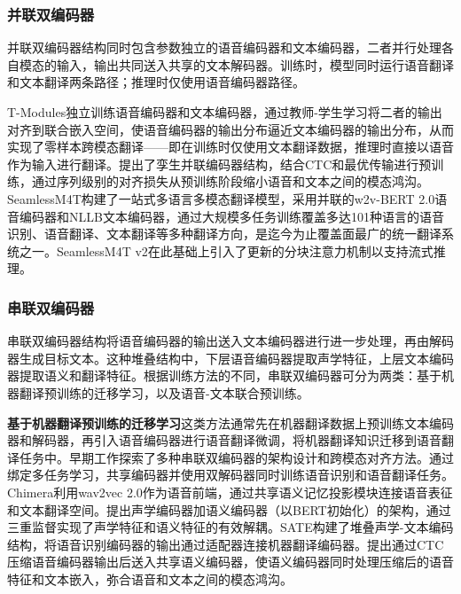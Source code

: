 \subsubsection{并联双编码器}\label{sec:rw_s2tt_parallel}

并联双编码器结构同时包含参数独立的语音编码器和文本编码器，二者并行处理各自模态的输入，输出共同送入共享的文本解码器。训练时，模型同时运行语音翻译和文本翻译两条路径；推理时仅使用语音编码器路径。

T-Modules\citep{duquenne-etal-2022-modules}独立训练语音编码器和文本编码器，通过教师-学生学习将二者的输出对齐到联合嵌入空间，使语音编码器的输出分布逼近文本编码器的输出分布，从而实现了零样本跨模态翻译——即在训练时仅使用文本翻译数据，推理时直接以语音作为输入进行翻译。\citet{ctcmeetsot}提出了孪生并联编码器结构，结合CTC和最优传输进行预训练，通过序列级别的对齐损失从预训练阶段缩小语音和文本之间的模态鸿沟。SeamlessM4T\citep{communication2023seamlessm4t}构建了一站式多语言多模态翻译模型，采用并联的w2v-BERT 2.0\citep{chung2021w2vbert}语音编码器和NLLB\citep{costa2022nllb}文本编码器，通过大规模多任务训练覆盖多达101种语言的语音识别、语音翻译、文本翻译等多种翻译方向，是迄今为止覆盖面最广的统一翻译系统之一。SeamlessM4T v2\citep{communication2023seamlessm4tv2}在此基础上引入了更新的分块注意力机制以支持流式推理。

\subsubsection{串联双编码器}\label{sec:rw_s2tt_serial}

串联双编码器结构将语音编码器的输出送入文本编码器进行进一步处理，再由解码器生成目标文本。这种堆叠结构中，下层语音编码器提取声学特征，上层文本编码器提取语义和翻译特征。根据训练方法的不同，串联双编码器可分为两类：基于机器翻译预训练的迁移学习，以及语音-文本联合预训练。

\textbf{基于机器翻译预训练的迁移学习}\quad 这类方法通常先在机器翻译数据上预训练文本编码器和解码器，再引入语音编码器进行语音翻译微调，将机器翻译知识迁移到语音翻译任务中。早期工作探索了多种串联双编码器的架构设计和跨模态对齐方法。\citet{anastasopoulos2018tied}通过绑定多任务学习，共享编码器并使用双解码器同时训练语音识别和语音翻译任务。Chimera\citep{han-etal-2021-learning}利用wav2vec 2.0作为语音前端，通过共享语义记忆投影模块连接语音表征和文本翻译空间。\citet{dong2021listen}提出声学编码器加语义编码器（以BERT初始化）的架构，通过三重监督实现了声学特征和语义特征的有效解耦。SATE\citep{xu2021sate}构建了堆叠声学-文本编码结构，将语音识别编码器的输出通过适配器连接机器翻译编码器。\citet{liu2020_bridging}提出通过CTC压缩语音编码器输出后送入共享语义编码器，使语义编码器同时处理压缩后的语音特征和文本嵌入，弥合语音和文本之间的模态鸿沟。

